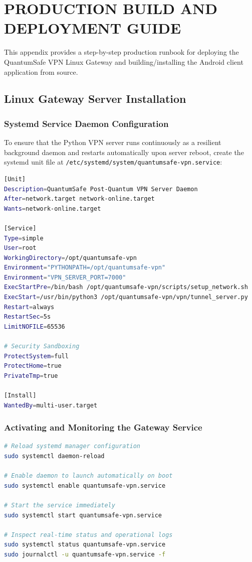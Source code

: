 
\chapter{PRODUCTION BUILD AND DEPLOYMENT GUIDE}
\label{app:deployment_guide}

This appendix provides a step-by-step production runbook for deploying the QuantumSafe VPN Linux Gateway and building/installing the Android client application from source.

\section{Linux Gateway Server Installation}

\subsection{Systemd Service Daemon Configuration}
To ensure that the Python VPN server runs continuously as a resilient background daemon and restarts automatically upon server reboot, create the systemd unit file at \texttt{/etc/systemd/system/quantumsafe-vpn.service}:

\begin{lstlisting}[language=bash, caption={Systemd Service Configuration (/etc/systemd/system/quantumsafe-vpn.service).}]
[Unit]
Description=QuantumSafe Post-Quantum VPN Server Daemon
After=network.target network-online.target
Wants=network-online.target

[Service]
Type=simple
User=root
WorkingDirectory=/opt/quantumsafe-vpn
Environment="PYTHONPATH=/opt/quantumsafe-vpn"
Environment="VPN_SERVER_PORT=7000"
ExecStartPre=/bin/bash /opt/quantumsafe-vpn/scripts/setup_network.sh
ExecStart=/usr/bin/python3 /opt/quantumsafe-vpn/vpn/tunnel_server.py
Restart=always
RestartSec=5s
LimitNOFILE=65536

# Security Sandboxing
ProtectSystem=full
ProtectHome=true
PrivateTmp=true

[Install]
WantedBy=multi-user.target
\end{lstlisting}

\subsection{Activating and Monitoring the Gateway Service}
\begin{lstlisting}[language=bash, caption={Enabling and Inspecting the VPN Gateway Daemon.}]
# Reload systemd manager configuration
sudo systemctl daemon-reload

# Enable daemon to launch automatically on boot
sudo systemctl enable quantumsafe-vpn.service

# Start the service immediately
sudo systemctl start quantumsafe-vpn.service

# Inspect real-time status and operational logs
sudo systemctl status quantumsafe-vpn.service
sudo journalctl -u quantumsafe-vpn.service -f
\end{lstlisting}


